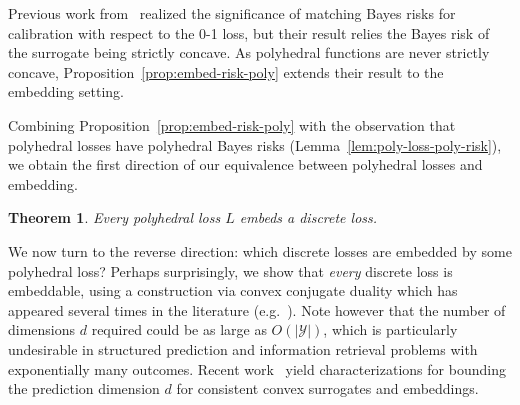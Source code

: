 \documentclass[12pt]{article}
\newcommand{\Comments}{1}
\newcommand{\mytodo}[2]{\ifnum\Comments=1%
  \todo[linecolor=#1!80!black,backgroundcolor=#1,bordercolor=#1!80!black]{#2}\fi}
\newcommand{\raft}[1]{\mytodo{green!20!white}{RF: #1}}
\newcommand{\Y}{\mathcal{Y}}
\newtheorem{theorem}{Theorem}
\begin{document}
Previous work from~\citet[Proposition 4]{duchi2018multiclass} realized the significance of matching Bayes risks for calibration with respect to the 0-1 loss, but their result relies the Bayes risk of the surrogate being strictly concave.  As polyhedral functions are never strictly concave, Proposition~\ref{prop:embed-risk-poly} extends their result to the embedding setting.


Combining Proposition~\ref{prop:embed-risk-poly} with the observation that polyhedral losses have polyhedral Bayes risks (Lemma~\ref{lem:poly-loss-poly-risk}), we obtain the first direction of our equivalence between polyhedral losses and embedding.

\begin{theorem}\label{thm:poly-embeds-discrete}
  Every polyhedral loss $L$ embeds a discrete loss.
\end{theorem}

We now turn to the reverse direction: which discrete losses are embedded by some polyhedral loss?
Perhaps surprisingly, we show that \emph{every} discrete loss is embeddable,
using a construction via convex conjugate duality which has appeared several times in the literature (e.g.\ \cite{duchi2018multiclass,abernethy2013efficient,frongillo2014general}).
Note however that the number of dimensions $d$ required could be as large as $O(|\Y|)$, which is particularly undesirable in structured prediction and information retrieval problems with exponentially many outcomes.
Recent work~\citep{ramaswamy2016convex,finocchiaro2020embedding,finocchiaro2021unifying} yield characterizations for bounding the prediction dimension $d$ for consistent convex surrogates and embeddings.
\end{document}

